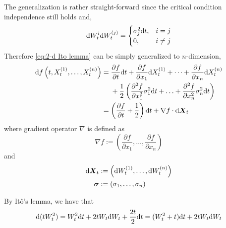 \documentclass{homework}
\begin{document}
\begin{subproblem}[(\alph*)]
        \item
        The generalization is rather straight-forward since
        the critical condition independence still holds and,
        \[\mathrm d W_t^{i}\mathrm d W_t^{(j)}=
        \begin{cases}
            \sigma_j^2\mathrm d t,&i=j\\
            0,&i\neq j
        \end{cases}\]
        Therefore \cref{eq:2-d Ito lemma} can be simply generalized
        to $n$-dimension,
        \begin{equation*}
            \begin{aligned}
            \mathrm d f\left(t,X_t^{(1)},\ldots,X_t^{(n)}\right)&=
            \begin{aligned}[t]
            &\frac{\partial f}{\partial t}\mathrm d t
            +\frac{\partial f}{\partial x_1}\mathrm d X_t^{(1)}
            +\cdots
            +\frac{\partial f}{\partial x_n}\mathrm d X_t^{(n)}\\
            &+\frac{1}{2}\left(
                \frac{\partial^2 f}{\partial x_1^2}\sigma_1^2\mathrm d t
                +\ldots
                +\frac{\partial^2 f}{\partial x_n^2}\sigma_n^2\mathrm d t
            \right)
            \end{aligned}\\
            &=\left(\frac{\partial f}{\partial t}
            +\frac{1}{2}\right)\mathrm d t
            +\nabla f\cdot\mathrm d\boldsymbol X_t
            \end{aligned}
        \end{equation*}
        where gradient operator $\nabla$ is defined as
        \[\nabla f:=\left(\frac{\partial f}{\partial x_1},\ldots,\frac{\partial f}{\partial x_n}\right)\]
        and
        \[\begin{aligned}
            \mathrm d\boldsymbol X_t&:=
            \left(\mathrm d W_t^{(1)},\ldots,\mathrm d W_t^{(n)}\right)\\
            \boldsymbol\sigma&:=
            \left(\sigma_1,\ldots,\sigma_n\right)
        \end{aligned}\]
        
        \item
    \end{subproblem}

    \problem
    By It\^o's lemma, we have that
    \[\mathrm d (tW_t^2)=W_t^2\mathrm d t+2tW_t\mathrm d W_t+\frac{2t}{2}\mathrm d t
    =(W_t^2+t)\mathrm d t+2tW_t\mathrm d W_t\]
\end{document}
